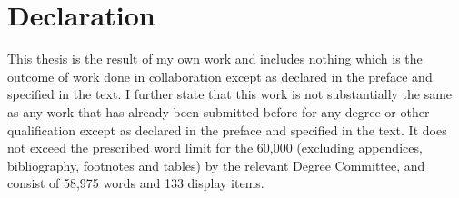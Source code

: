\chapter{Declaration}
This thesis is the result of my own work and includes nothing which is the outcome of work done in collaboration except as declared in the preface and specified in the text. I further state that this work is not substantially the same as any work that has already been submitted before for any degree or other qualification except as declared in the preface and specified in the text. It does not exceed the prescribed word limit for the 60,000 (excluding appendices, bibliography, footnotes and tables) by the relevant Degree Committee, and consist of 58,975 words and 133 display items.



